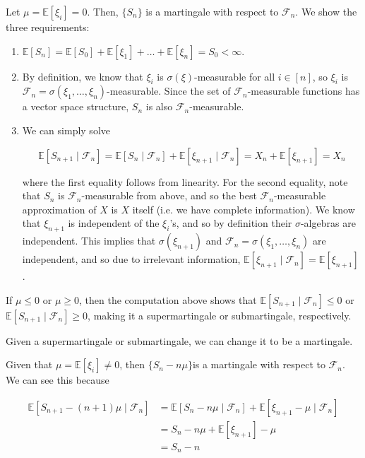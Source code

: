 \documentclass{article}
\begin{document}
  \begin{example}
    Let $\mu = \mathbb{E}[\xi_i] = 0$. Then, $\{S_n\}$ is a martingale with respect to $\mathcal{F}_n$. We show the three requirements: 
    \begin{enumerate}
      \item $\mathbb{E}[S_n] = \mathbb{E}[S_0] + \mathbb{E}[\xi_1] + \ldots + \mathbb{E}[\xi_n] = S_0 < \infty$. 
      
      \item By definition, we know that $\xi_i$ is $\sigma(\xi)$-measurable for all $i \in [n]$, so $\xi_i$ is $\mathcal{F}_n = \sigma(\xi_1, \ldots, \xi_n)$-measurable. Since the set of $\mathcal{F}_n$-measurable functions has a vector space structure, $S_n$ is also $\mathcal{F}_n$-measurable. 
      
      \item We can simply solve 

        \[\mathbb{E}[S_{n+1} \mid \mathcal{F}_n] = \mathbb{E}[S_n \mid \mathcal{F}_n] + \mathbb{E}[\xi_{n+1} \mid \mathcal{F}_n] = X_n + \mathbb{E}[\xi_{n+1}] = X_n\]

      where the first equality follows from linearity. For the second equality, note that $S_n$ is $\mathcal{F}_n$-measurable from above, and so the best $\mathcal{F}_n$-measurable approximation of $X$ is $X$ itself (i.e. we have complete information). We know that $\xi_{n+1}$ is independent of the $\xi_i$'s, and so by definition their $\sigma$-algebras are independent. This implies that $\sigma(\xi_{n+1})$ and $\mathcal{F}_n = \sigma(\xi_1, \ldots, \xi_n)$ are independent, and so due to irrelevant information, $\mathbb{E}[\xi_{n+1} \mid \mathcal{F}_n] = \mathbb{E}[\xi_{n+1}]$. 
    \end{enumerate}
    If $\mu \leq 0$ or $\mu \geq 0$, then the computation above shows that $\mathbb{E}[S_{n+1} \mid \mathcal{F}_n] \leq 0$ or $\mathbb{E}[S_{n+1} \mid \mathcal{F}_n] \geq 0$, making it a supermartingale or submartingale, respectively. 
  \end{example}

  Given a supermartingale or submartingale, we can change it to be a martingale. 

  \begin{example}
  Given that $\mu = \mathbb{E}[\xi_i] \neq 0$, then $\{S_n - n\mu\}$is a martingale with respect to $\mathcal{F}_n$. We can see this because

  \begin{align*}
    \mathbb{E}[S_{n+1} - (n + 1)\mu \mid \mathcal{F}_n] & = \mathbb{E}[S_n - n \mu \mid \mathcal{F}_n] + \mathbb{E}[\xi_{n+1} - \mu \mid \mathcal{F}_n] \\
    & = S_n - n \mu + \mathbb{E}[\xi_{n+1}] - \mu \\
    & = S_n - n
  \end{align*}
  \end{example}
\end{document}
